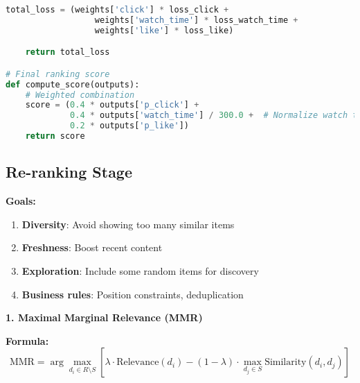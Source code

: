 \documentclass[10pt]{article}
\begin{document}
\begin{lstlisting}[language=Python]
    total_loss = (weights['click'] * loss_click +
                  weights['watch_time'] * loss_watch_time +
                  weights['like'] * loss_like)

    return total_loss

# Final ranking score
def compute_score(outputs):
    # Weighted combination
    score = (0.4 * outputs['p_click'] +
             0.4 * outputs['watch_time'] / 300.0 +  # Normalize watch time
             0.2 * outputs['p_like'])
    return score
\end{lstlisting}

\subsection{Re-ranking Stage}

\textbf{Goals:}
\begin{enumerate}
\item \textbf{Diversity}: Avoid showing too many similar items
\item \textbf{Freshness}: Boost recent content
\item \textbf{Exploration}: Include some random items for discovery
\item \textbf{Business rules}: Position constraints, deduplication
\end{enumerate}

\textbf{1. Maximal Marginal Relevance (MMR)}

\textbf{Formula:}
\begin{equation}
\text{MMR} = \arg\max_{d_i \in R \setminus S} [\lambda \cdot \text{Relevance}(d_i) - (1-\lambda) \cdot \max_{d_j \in S} \text{Similarity}(d_i, d_j)]
\end{equation}
\end{document}
